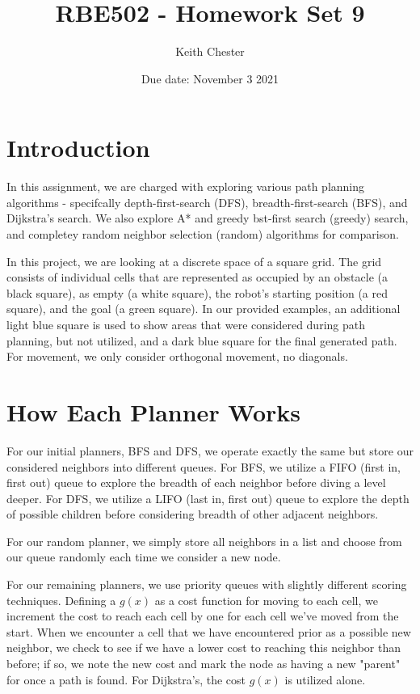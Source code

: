\documentclass{article}
\title{RBE502 - Homework Set 9}
\author{Keith Chester}
\date{Due date: November 3 2021}
\begin{document}
\maketitle

\section*{Introduction}
In this assignment, we are charged with exploring various path planning algorithms - specifcally depth-first-search (DFS), breadth-first-search (BFS), and Dijkstra's search. We also explore A* and greedy bst-first search (greedy) search, and completey random neighbor selection (random) algorithms for comparison.

In this project, we are looking at a discrete space of a square grid. The grid consists of individual cells that are represented as occupied by an obstacle (a black square), as empty (a white square), the robot's starting position (a red square), and the goal (a green square). In our provided examples, an additional light blue square is used to show areas that were considered during path planning, but not utilized, and a dark blue square for the final generated path. For movement, we only consider orthogonal movement, no diagonals.

\section*{How Each Planner Works}
For our initial planners, BFS and DFS, we operate exactly the same but store our considered neighbors into different queues. For BFS, we utilize a FIFO (first in, first out) queue to explore the breadth of each neighbor before diving a level deeper. For DFS, we utilize a LIFO (last in, first out) queue to explore the depth of possible children before considering breadth of other adjacent neighbors.

For our random planner, we simply store all neighbors in a list and choose from our queue randomly each time we consider a new node.

For our remaining planners, we use priority queues with slightly different scoring techniques. Defining a $g(x)$ as a cost function for moving to each cell, we increment the cost to reach each cell by one for each cell we've moved from the start. When we encounter a cell that we have encountered prior as a possible new neighbor, we check to see if we have a lower cost to reaching this neighbor than before; if so, we note the new cost and mark the node as having a new "parent" for once a path is found. For Dijkstra's, the cost $g(x)$ is utilized alone.
\end{document}
